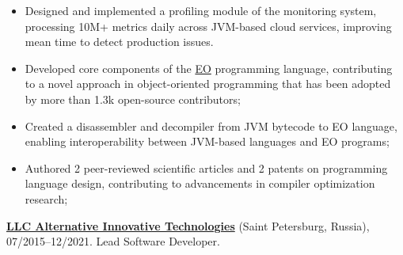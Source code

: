 \documentclass{vl}
\begin{document}

\begin{itemize}
    \itemsep0em
    \item Designed and implemented a profiling module of the monitoring system, processing 10M+ metrics daily across JVM-based cloud services, improving mean time to detect production issues.
    \item Developed core components of the \href{https://github.com/objectionary/eo}{EO} programming language,
        contributing to a novel approach in object-oriented programming that has been adopted by more than 1.3k open-source contributors;
    \item Created a disassembler and decompiler from JVM bytecode to EO language, enabling interoperability between JVM-based languages and EO programs;
    \item Authored 2 peer-reviewed scientific articles and 2 patents on programming language design, contributing to advancements in compiler optimization research;
\end{itemize}


\textbf{\href{https://altinntech.com/en/}{LLC Alternative Innovative Technologies}} (Saint Petersburg, Russia),
07/2015--12/2021.
Lead Software Developer.
\end{document}
